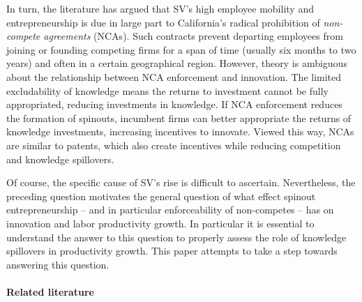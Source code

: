 \documentclass[12pt,english]{article}
\theoremstyle{remark}
\begin{document}
In turn, the literature has argued that SV's high employee mobility and entrepreneurship is due in large part to California's radical prohibition of \textit{non-compete agreements} (NCAs). Such contracts prevent departing employees from joining or founding competing firms for a span of time (usually six months to two years) and often in a certain geographical region. However, theory is ambiguous about the relationship between NCA enforcement and innovation. The limited excludability of knowledge means the returns to investment cannot be fully appropriated, reducing investments in knowledge. If NCA enforcement reduces the formation of spinouts, incumbent firms can better appropriate the returns of knowledge investments, increasing incentives to innovate. Viewed this way, NCAs are similar to patents, which also create incentives while reducing competition and knowledge spillovers.

Of course, the specific cause of SV's rise is difficult to ascertain. Nevertheless, the preceding question motivates the general question of what effect spinout entrepreneurship -- and in particular enforceability of non-competes -- has on innovation and labor productivity growth. In particular it is essential to understand the answer to this question to properly assess the role of knowledge spillovers in productivity growth. This paper attempts to take a step towards answering this question.



\paragraph{Related literature}
\end{document}
